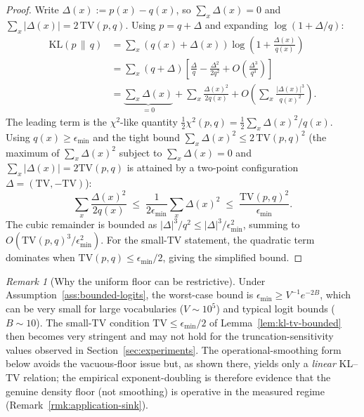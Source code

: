 \documentclass[11pt]{article}
\newcommand{\KLs}{\mathrm{KL}}
\newcommand{\TV}{\mathrm{TV}}
\theoremstyle{plain}
\theoremstyle{definition}
\theoremstyle{remark}
\newtheorem{remark}[theorem]{Remark}
\begin{document}
\begin{proof}
Write $\Delta(x) := p(x) - q(x)$, so $\sum_x \Delta(x) = 0$ and
$\sum_x |\Delta(x)| = 2\,\TV(p, q)$. Using $p = q + \Delta$ and
expanding $\log(1 + \Delta/q)$:
\begin{align*}
\KLs(p \,\|\, q)
&= \sum_x (q(x) + \Delta(x)) \log\!\left(1 + \frac{\Delta(x)}{q(x)}\right) \\
&= \sum_x (q + \Delta) \left[\frac{\Delta}{q}
   - \frac{\Delta^2}{2 q^2} + O\!\left(\frac{\Delta^3}{q^3}\right) \right] \\
&= \underbrace{\sum_x \Delta(x)}_{= 0}
   + \sum_x \frac{\Delta(x)^2}{2 q(x)}
   + O\!\left(\sum_x \frac{|\Delta(x)|^3}{q(x)^2}\right).
\end{align*}
The leading term is the $\chi^2$-like quantity
$\frac{1}{2}\chi^2(p, q) = \frac{1}{2}\sum_x \Delta(x)^2/q(x)$.
Using $q(x) \geq \epsilon_{\min}$ and the tight bound
$\sum_x \Delta(x)^2 \leq 2\,\TV(p, q)^2$ (the maximum of
$\sum_x \Delta(x)^2$ subject to $\sum_x \Delta(x) = 0$ and
$\sum_x |\Delta(x)| = 2\TV(p,q)$ is attained by a two-point
configuration $\Delta = (\TV, -\TV)$):
\[
\sum_x \frac{\Delta(x)^2}{2 q(x)}
\;\leq\; \frac{1}{2 \epsilon_{\min}} \sum_x \Delta(x)^2
\;\leq\; \frac{\TV(p, q)^2}{\epsilon_{\min}}.
\]
The cubic remainder is bounded as
$|\Delta|^3/q^2 \leq |\Delta|^3/\epsilon_{\min}^2$, summing to
$O(\TV(p, q)^3 / \epsilon_{\min}^2)$. For the small-TV statement,
the quadratic term dominates when $\TV(p, q) \leq \epsilon_{\min}/2$,
giving the simplified bound.
\end{proof}

\begin{remark}[Why the uniform floor can be restrictive]
\label{rmk:eps-min-vacuous}
Under Assumption~\ref{ass:bounded-logits}, the worst-case bound is
$\epsilon_{\min} \geq V^{-1} e^{-2B}$, which can be very small for
large vocabularies ($V \sim 10^5$) and typical logit bounds
($B \sim 10$). The small-TV condition $\TV \leq \epsilon_{\min}/2$
of Lemma~\ref{lem:kl-tv-bounded} then becomes very stringent and
may not hold for the truncation-sensitivity values observed in
Section~\ref{sec:experiments}. The operational-smoothing form
below avoids the vacuous-floor issue but, as shown there, yields
only a \emph{linear} KL--TV relation; the empirical
exponent-doubling is therefore evidence that the genuine density
floor (not smoothing) is operative in the measured regime
(Remark~\ref{rmk:application-sink}).
\end{remark}
\end{document}
